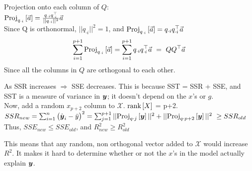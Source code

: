 \documentclass[12pt]{article}
\begin{document}
\begin{enumerate}
 
Projection onto each column of $Q$:\\

$\text{Proj}_{q_{\cdot i}}\left[\vec{a}\right] = \frac{q_{\cdot i} q_{\cdot i}^\top}{\vert \vert q_{\cdot i} \vert \vert ^2} \vec{a} $\\

Since Q is orthonormal, $\vert \vert q_{\cdot i} \vert \vert ^2 =1$, and $\text{Proj}_{q_{\cdot i}}\left[\vec{a}\right] = q_{\cdot i} q_{\cdot i}^\top \vec{a}$ \\

$$\sum_{i= 1}^{p+1} \proj{q_{\cdot i}}{\vec{a}} = \sum_{i= 1}^{p+1} q_{\cdot i} q_{\cdot i}^\top \vec{a} \ = \ QQ^\top \vec{a}$$
Since all the columns in $Q$ are orthogonal to each other. 





As SSR increases $\Rightarrow$ SSE decreases. This is because SST = SSR + SSE, and SST is a measure of variance in $\boldsymbol{y}$; it doesn't depend on the $x$'s or $g$. \\
Now, add a random $x_{p+2}$ column to $\mathcal{X}$. $\text{rank}\left[X\right]$ = p+2. \\
$SSR_{new} =  \sum_{i=1}^{n} \big(\hat{\boldsymbol{y}}_i - \bar{y} \big)^2 = \sum_{j =1}^{p+1} \vert \vert \text{Proj}_{q\cdot  j}\left[\boldsymbol{y}\right] \vert \vert ^2 + \vert \vert \text{Proj}_{q\cdot  p+2}\left[\boldsymbol{y}\right] \vert \vert^2 \ \geq SSR_{old}$ \\
Thus, $SSE_{new} \leq SSE_{old}$, and $R_{new}^2 \geq R_{old}^2$




This means that any random, non orthogonal vector added to $\mathcal{X}$ would increase $R^2$. It makes it hard to determine whether or not the $x$'s in the model actually explain $\boldsymbol{y}$.  



\end{enumerate}
\end{document}
